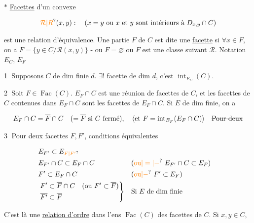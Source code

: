 
$\ast$ \uline{Facettes} d'un convexe

\[
\unsure{\mathcal R|R}(x,y):\quad (x=y\ \text{ou}\ x\ \text{et}\ y\ \text{sont intérieurs à}\ D_{x,y}\cap C)
\]

est une relation d'équivalence. Une partie $F$ de $C$ est dite une \uline{facette} si $\forall x\in F$, on a $F=\{y\in C/\mathcal R(x,y)\}$ -  ou  $F=\varnothing$  ou $F$ est une classe suivant $\mathcal R$. Notation $E_C$, $E_F$


\textcircled{1} Supposons $C$ de dim finie $d$. $\exists!$ facette de dim $d$, c'est $\operatorname{int}_{E_C}(C)$.

\textcircled{2} Soit $F\in\operatorname{Fac}(C)$.   $E_F\cap C$ est une réunion de facettes de $C$, et  les facettes de $C$ contenues dans $E_F\cap C$ sont les facettes de $E_F\cap C$. Si $E$ de dim finie, on a

\[
 E_F\cap C=\overline F\cap C\quad(=\overline F\ \text{si }C\text{ fermé}),\quad \inserted{\text{et }F=\operatorname{int}_{E_F}(E_F\cap C)}\quad\deleted{\text{Pour deux}}
\]

\textcircled{3} Pour deux facettes $F,F'$, conditions équivalentes

\[
\begin{aligned}
&E_{F'}\subset E_{\unsure{F|F'}}\\
&E_{F'}\cap C\subset E_F\cap C &&(\unsure{\text{ou}|=|-}\ E_{F'}\cap C\subset E_F)\\
&F'\subset E_F\cap C &&(\unsure{\text{ou}|-}\ F'\subset E_F)\\
&\left.\begin{aligned}
F'&\subset\overline F\cap C &(\text{ou }F'\subset\overline F)\\
\overline{F'}&\subset\overline F
\end{aligned}\right\} &&\text{Si } E \text{ de dim finie}
\end{aligned}
\]

C'est là une \uline{relation d'ordre} dans l'ens $\operatorname{Fac}(C)$ des facettes de $C$. Si $x,y\in{C}$, 

